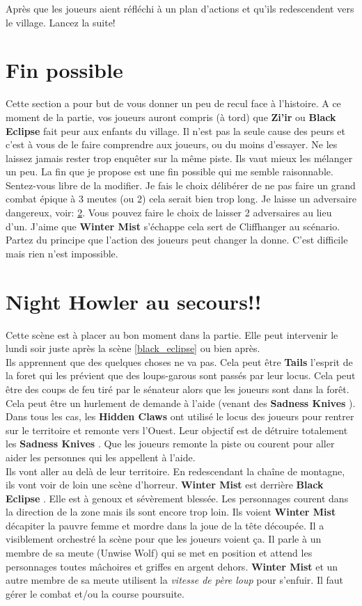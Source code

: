 \documentclass[oneside,12pt]{book}
\newcommand{\BlackEclipse}{\textbf{Black Eclipse} }
\newcommand{\Tails}{\textbf{Tails} }
\newcommand{\Thomas}{\textbf{Zi'ir} }
\newcommand{\Sadness}{\textbf{Sadness Knives} }
\newcommand{\Hidden}{\textbf{Hidden Claws} }
\begin{document}
\begin{flushleft}
Après que les joueurs aient réfléchi à un plan d'actions et qu'ils redescendent vers le village. Lancez la suite!


\section{Fin possible}
Cette section a pour but de vous donner un peu de recul face à l'histoire. A ce moment de la partie, vos joueurs auront compris (à tord) que \Thomas ou \BlackEclipse fait peur aux enfants du village. Il n'est pas la seule cause des peurs et c'est à vous de le faire comprendre aux joueurs, ou du moins d'essayer. Ne les laissez jamais rester trop enquêter sur la même piste. Ils vaut mieux les mélanger un peu. La fin que je propose est une fin possible qui me semble raisonnable. Sentez-vous libre de la modifier. Je fais le choix délibérer de ne pas faire un grand combat épique à 3 meutes (ou 2) cela serait bien trop long. Je laisse un adversaire dangereux, voir: \ref{ausecours}.
Vous pouvez faire le choix de laisser 2 adversaires au lieu d'un. J'aime que \textbf{Winter Mist} s'échappe cela sert de Cliffhanger au scénario. Partez du principe que l'action des joueurs peut changer la donne. C'est difficile mais rien n'est impossible.

\section{Night Howler au secours!!}
\label{ausecours}
Cette scène est à placer au bon moment dans la partie. Elle peut intervenir le lundi soir juste  après la scène \ref{black_eclipse} ou bien après. \\
Ils apprennent que des quelques choses ne va pas. Cela peut être \Tails l'esprit de la foret qui les prévient que des loups-garous sont passés par leur locus. Cela peut être des coups de feu tiré par le sénateur alors que les joueurs sont dans la forêt. Cela peut être un hurlement de demande à l'aide (venant des \Sadness). \\
Dans tous les cas, les \Hidden ont utilisé le locus des joueurs pour rentrer sur le territoire et remonte vers l'Ouest. Leur objectif est de détruire totalement les \Sadness.
Que les joueurs remonte la piste ou courent pour aller aider les personnes qui les appellent à l'aide. \\
Ils vont aller au delà de leur territoire. En redescendant la chaîne de montagne, ils vont voir de loin une scène d'horreur. 
\textbf{Winter Mist} est derrière \BlackEclipse. Elle est à genoux et sévèrement blessée. Les personnages courent dans la direction de la zone mais ils sont encore trop loin. Ils voient \textbf{Winter Mist} décapiter la pauvre femme et mordre dans la joue de la tête découpée. Il a visiblement orchestré la scène pour que les joueurs voient ça. Il parle à un membre de sa meute (Unwise Wolf) qui se met en position et attend les personnages toutes mâchoires et griffes en argent dehors. \textbf{Winter Mist} et un autre membre de sa meute utilisent la \textit{vitesse de père loup} pour s'enfuir. Il faut gérer le combat et/ou la course poursuite.  


\end{flushleft}
\end{document}
